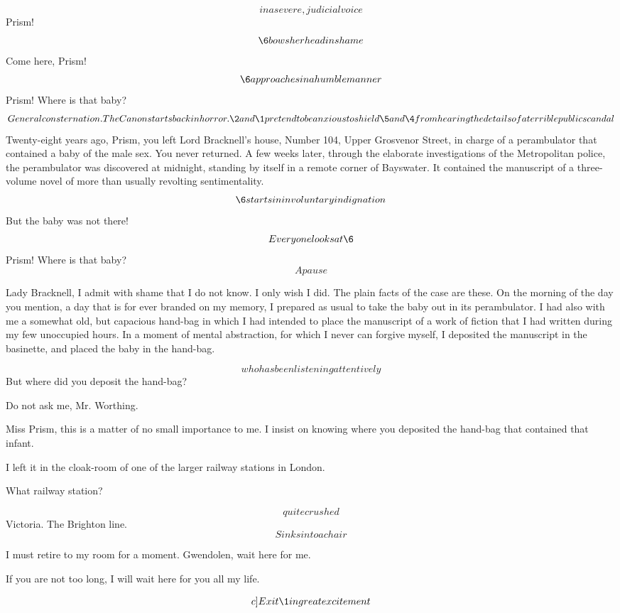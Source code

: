 \documentclass{book}
\begin{document}
\3  \[in a severe, judicial voice\]  Prism!  \[\6
bows her head in shame\]  Come here, Prism!  \[\6
approaches in a humble manner\]  Prism!  Where is that baby?
\[General consternation.  The Canon starts back in horror.  \2
and \1 pretend to be anxious to shield \5 and \4 from
hearing the details of a terrible public scandal\] Twenty-eight
years ago, Prism, you left Lord Bracknell's house, Number 104,
Upper Grosvenor Street, in charge of a perambulator that contained
a baby of the male sex.  You never returned.  A few weeks later,
through the elaborate investigations of the Metropolitan police,
the perambulator was discovered at midnight, standing by itself in
a remote corner of Bayswater.  It contained the manuscript of a
three-volume novel of more than usually revolting sentimentality.
\[\6 starts in involuntary indignation\]  But the baby was
not there!  \[Every one looks at \6\]  Prism!  Where is that
baby?  \[A pause\]

\6  Lady Bracknell, I admit with shame that I do not know.
I only wish I did.  The plain facts of the case are these.  On the
morning of the day you mention, a day that is for ever branded on
my memory, I prepared as usual to take the baby out in its
perambulator.  I had also with me a somewhat old, but capacious
hand-bag in which I had intended to place the manuscript of a work
of fiction that I had written during my few unoccupied hours.  In a
moment of mental abstraction, for which I never can forgive myself,
I deposited the manuscript in the basinette, and placed the baby in
the hand-bag.

\1  \[who has been listening attentively\]  But where did you
deposit the hand-bag?

\6  Do not ask me, Mr. Worthing.

\1  Miss Prism, this is a matter of no small importance to me.
I insist on knowing where you deposited the hand-bag that contained
that infant.

\6  I left it in the cloak-room of one of the larger
railway stations in London.

\1  What railway station?

\6  \[quite crushed\]  Victoria.  The Brighton line. \[Sinks into a chair\]

\1  I must retire to my room for a moment.  Gwendolen, wait here
for me.

\4  If you are not too long, I will wait here for you all
my life. 

\[c]Exit \1 in great excitement\]
\end{document}
